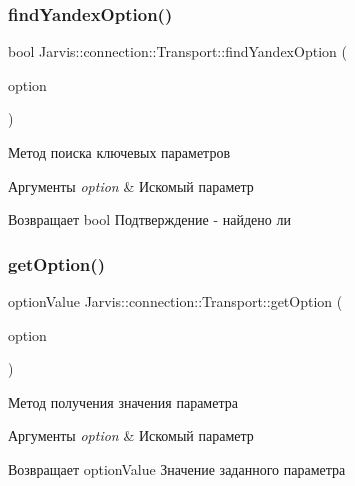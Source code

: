 \subsubsection{\texorpdfstring{find\+Yandex\+Option()}{findYandexOption()}}
{\footnotesize\ttfamily bool Jarvis\+::connection\+::\+Transport\+::find\+Yandex\+Option (\begin{DoxyParamCaption}\item[{const yandex\+Option \&}]{option }\end{DoxyParamCaption})}



Метод поиска ключевых параметров 


\begin{DoxyParams}{Аргументы}
{\em option} & Искомый параметр \\
\hline
\end{DoxyParams}
\begin{DoxyReturn}{Возвращает}
bool Подтверждение -\/ найдено ли 
\end{DoxyReturn}
\mbox{\label{classJarvis_1_1connection_1_1Transport_a46481607af9201bd96cd37f44ab3f02a}} 
\subsubsection{\texorpdfstring{get\+Option()}{getOption()}}
{\footnotesize\ttfamily option\+Value Jarvis\+::connection\+::\+Transport\+::get\+Option (\begin{DoxyParamCaption}\item[{const option \&}]{option }\end{DoxyParamCaption})}



Метод получения значения параметра 


\begin{DoxyParams}{Аргументы}
{\em option} & Искомый параметр \\
\hline
\end{DoxyParams}
\begin{DoxyReturn}{Возвращает}
option\+Value Значение заданного параметра 
\end{DoxyReturn}
\mbox{\label{classJarvis_1_1connection_1_1Transport_a9b15d1e6a7be779dcf8284ff0f17a8b0}} 
